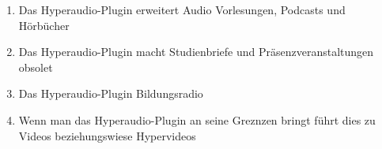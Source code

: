 \begin{enumerate}
\item Das Hyperaudio-Plugin erweitert Audio Vorlesungen, Podcasts und Hörbücher
\item Das Hyperaudio-Plugin macht Studienbriefe und Präsenzveranstaltungen obsolet
\item Das Hyperaudio-Plugin Bildungsradio
\item Wenn man das Hyperaudio-Plugin an seine Greznzen bringt führt dies zu Videos beziehungswiese Hypervideos
\end{enumerate}




